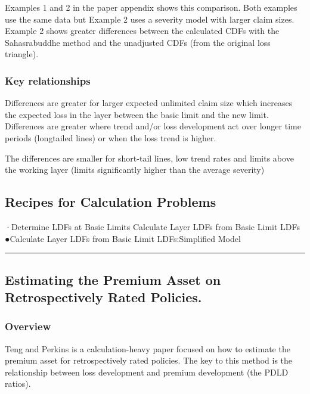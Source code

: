 \documentclass[
]{article}
\begin{document}
Examples 1 and 2 in the paper appendix shows this comparison. Both
examples use the same data but Example 2 uses a severity model with
larger claim sizes. Example 2 shows greater differences between the
calculated CDFs with the Sahasrabuddhe method and the unadjusted CDFs
(from the original loss triangle).

\subsubsection{Key relationships}\label{key-relationships}

Differences are greater for larger expected unlimited claim size which
increases the expected loss in the layer between the basic limit and the
new limit. Differences are greater where trend and/or loss development
act over longer time periods (longtailed lines) or when the loss trend
is higher.

The differences are smaller for short-tail lines, low trend rates and
limits above the working layer (limits significantly higher than the
average severity)

\subsection{Recipes for Calculation
Problems}\label{recipes-for-calculation-problems-8}

·Determine LDFs at Basic Limits Calculate Layer LDFs from Basic Limit
LDFs ●Calculate Layer LDFs from Basic Limit LDFs:Simplified Model

\begin{center}\rule{0.5\linewidth}{0.5pt}\end{center}

\subsection{Estimating the Premium Asset on Retrospectively Rated
Policies.}\label{estimating-the-premium-asset-on-retrospectively-rated-policies.}

\subsubsection{Overview}\label{overview-9}

Teng and Perkins is a calculation-heavy paper focused on how to estimate
the premium asset for retrospectively rated policies. The key to this
method is the relationship between loss development and premium
development (the PDLD ratios).
\end{document}
